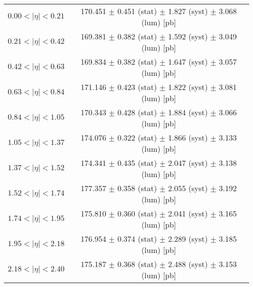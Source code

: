 \begin{tabular}{lc}
\hline
$0.00 < |\eta| <0.21$          & 170.451 $\pm$ 0.451 (stat) $\pm$ 1.827 (syst) $\pm$ 3.068 (lum) [pb]  \\
$0.21 < |\eta| <0.42$          & 169.381 $\pm$ 0.382 (stat) $\pm$ 1.592 (syst) $\pm$ 3.049 (lum) [pb]  \\
$0.42 < |\eta| <0.63$          & 169.834 $\pm$ 0.382 (stat) $\pm$ 1.647 (syst) $\pm$ 3.057 (lum) [pb]  \\
$0.63 < |\eta| <0.84$          & 171.146 $\pm$ 0.423 (stat) $\pm$ 1.822 (syst) $\pm$ 3.081 (lum) [pb]  \\
$0.84 < |\eta| <1.05$          & 170.343 $\pm$ 0.428 (stat) $\pm$ 1.884 (syst) $\pm$ 3.066 (lum) [pb]  \\
$1.05 < |\eta| <1.37$          & 174.076 $\pm$ 0.322 (stat) $\pm$ 1.866 (syst) $\pm$ 3.133 (lum) [pb]  \\
$1.37 < |\eta| <1.52$          & 174.341 $\pm$ 0.435 (stat) $\pm$ 2.047 (syst) $\pm$ 3.138 (lum) [pb]  \\
$1.52 < |\eta| <1.74$          & 177.357 $\pm$ 0.358 (stat) $\pm$ 2.055 (syst) $\pm$ 3.192 (lum) [pb]  \\
$1.74 < |\eta| <1.95$          & 175.810 $\pm$ 0.360 (stat) $\pm$ 2.041 (syst) $\pm$ 3.165 (lum) [pb]  \\
$1.95 < |\eta| <2.18$          & 176.954 $\pm$ 0.374 (stat) $\pm$ 2.289 (syst) $\pm$ 3.185 (lum) [pb]  \\
$2.18 < |\eta| <2.40$          & 175.187 $\pm$ 0.368 (stat) $\pm$ 2.488 (syst) $\pm$ 3.153 (lum) [pb]  \\
\hline
\end{tabular}
